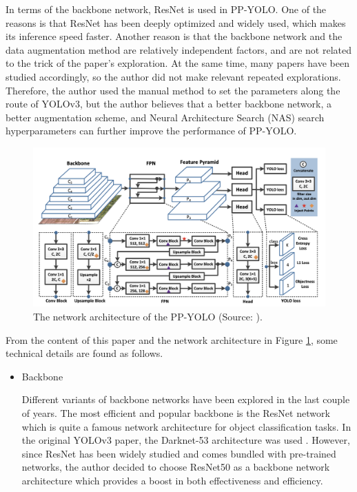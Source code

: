 \documentclass[journal,article,submit,moreauthors,pdftex]{Definitions/mdpi}
\begin{document}
In terms of the backbone network, ResNet is used in PP-YOLO. One of the reasons is that ResNet has been deeply optimized and widely used, which makes its inference speed faster. Another reason is that the backbone network and the data augmentation method are relatively independent factors, and are not related to the trick of the paper's exploration. At the same time, many papers have been studied accordingly, so the author did not make relevant repeated explorations. Therefore, the author used the manual method to set the parameters along the route of YOLOv3, but the author believes that a better backbone network, a better augmentation scheme, and Neural Architecture Search (NAS) search hyperparameters can further improve the performance of PP-YOLO.


\begin{figure}[htbp]
\centering
\includegraphics[width=1\columnwidth]{images/PP-YOLO architecture.png}
\caption{The network architecture of the PP-YOLO (Source: \cite{long2020pp}).}
\label{fig:network architecture}
\end{figure}

From the content of this paper and the network architecture in Figure \ref{fig:network architecture}, some technical details are found as follows.

\begin{itemize}
\item{Backbone}

Different variants of backbone networks have been explored in the last couple of years. The most efficient and popular backbone is the ResNet network which is quite a famous network architecture for object classification tasks. In the original YOLOv3 paper, the Darknet-53 architecture was used \cite{he2016deep}. However, since ResNet has been widely studied and comes bundled with pre-trained networks, the author decided to choose ResNet50 as a backbone network architecture which provides a boost in both effectiveness and efficiency.

\end{itemize}
\end{document}
